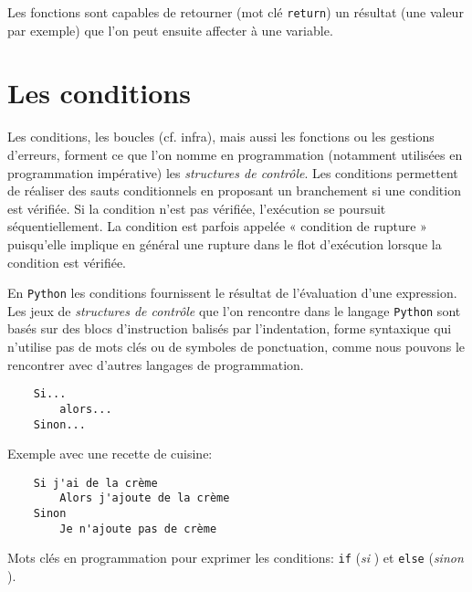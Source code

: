Les fonctions sont capables de retourner (mot clé \texttt{return}) un résultat (une valeur par exemple) que l'on peut ensuite affecter à une variable.
\medskip

\section{Les conditions}
Les conditions, les boucles (cf. infra), mais aussi les fonctions ou les gestions d'erreurs, forment ce que l'on nomme en programmation (notamment utilisées en programmation impérative) les \textit{structures de contrôle}. Les conditions permettent de réaliser des sauts conditionnels en proposant un branchement si une condition est vérifiée. Si la condition n'est pas vérifiée, l'exécution se poursuit séquentiellement. La condition est parfois appelée « condition de rupture » puisqu'elle implique en général une rupture dans le flot d'exécution lorsque la condition est vérifiée. 
\medskip

En \texttt{Python} les conditions fournissent le résultat de l'évaluation d'une expression. Les jeux de \textit{structures de contrôle} que l'on rencontre dans le langage \texttt{Python} sont basés sur des blocs d'instruction balisés par l'indentation, forme syntaxique qui n'utilise pas de mots clés ou de symboles de ponctuation, comme nous pouvons le rencontrer avec d'autres langages de programmation.
\begin{verbatim}
    Si...
        alors...
    Sinon...
\end{verbatim}
\medskip

Exemple avec une recette de cuisine:
\begin{verbatim}
    Si j'ai de la crème
        Alors j'ajoute de la crème
    Sinon
        Je n'ajoute pas de crème
\end{verbatim}
\medskip

Mots clés en programmation pour exprimer les conditions: \texttt{if} (\og \textit{si} \fg{})  et \texttt{else} (\og \textit{sinon} \fg{}).
\medskip

